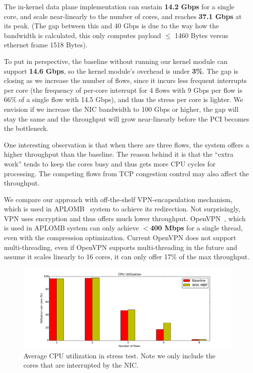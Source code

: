 The in-kernel data plane implementation can sustain \textbf{14.2 Gbps} for a single core, and scale near-linearly to the number of cores, and reaches \textbf{37.1 Gbps} at its peak. (The gap between this and 40 Gbps is due to the way how the bandwidth is calculated, this only computes payload $\leq$ 1460 Bytes versus ethernet frame 1518 Bytes).

To put in perspective, the baseline without running our kernel module can support \textbf{14.6 Gbps}, so the kernel module's overhead is under \textbf{3\%}. The gap is closing as we increase the number of flows, since it incurs less frequent interrupts per core (the frequency of per-core interrupt for 4 flows with 9 Gbps per flow is 66\% of a single flow with 14.5 Gbps), and thus the stress per core is lighter. We envision if we increase the NIC bandwidth to 100 Gbps or higher, the gap will stay the same and the throughput will grow near-linearly before the PCI becomes the bottleneck. 

One interesting observation is that when there are three flows, the system offers a higher throughput than the baseline. The reason behind it is that the ``extra work'' tends to keep the cores busy and thus gets more CPU cycles for processing. The competing flows from TCP congestion control may also affect the throughput. 

We compare our approach with off-the-shelf VPN-encapsulation mechanism, which is used in APLOMB~\cite{Aplomb} system to achieve its redirection. Not surprisingly, VPN uses encryption and thus offers much lower throughput. OpenVPN~\cite{openvpn}, which is used in APLOMB system can only achieve $<$\textbf{400 Mbps} for a single thread, even with the compression optimization. Current OpenVPN does not support multi-threading, even if OpenVPN supports multi-threading in the future and assume it scales linearly to 16 cores, it can only offer 17\% of the max throughput. 

\begin{figure}[ht]
\centering
\includegraphics[width=\linewidth]{figures/CPU.pdf} 
\caption{\small Average CPU utilization in stress test. Note we only include the cores that are interrupted by the NIC.}\label{throughput}
\end{figure}

